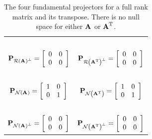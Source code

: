 \begin{table}[htdp]
\begin{center}
\begin{tabular}{cc}
\ \\
 $\projrap = \mat{cc}{0&0\\0&0}$ & $\projratp = \mat{cc}{0&0\\0&0}$ \\
\ \\
 $\projna = \itwo$ & $\projnat = \itwo$ \\
\ \\
 $\projnap = \mat{cc}{0&0\\0&0}$ & $\projnatp = \mat{cc}{0&0\\0&0}$ \\
\end{tabular}
\end{center}
\label{tab:proj:a}
\caption{The four fundamental projectors for a full rank matrix and its transpose. There is no null space for either $\A{}$ or $\A{T}$.}
\end{table}%

